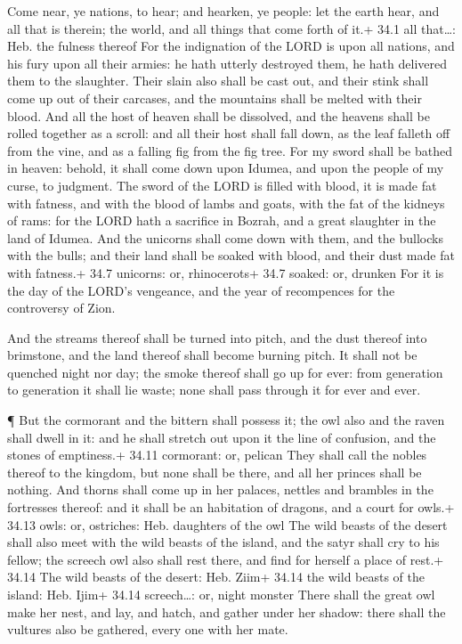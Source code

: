  Come near, ye nations, to hear; and hearken, ye people: let
the earth hear, and all that is therein; the world, and all things that
come forth of it.+ 34.1 all that\ldots: Heb. the fulness thereof
 For the indignation of the LORD is upon all nations, and
his fury upon all their armies: he hath utterly destroyed them, he hath
delivered them to the slaughter.  Their slain also shall be
cast out, and their stink shall come up out of their carcases, and the
mountains shall be melted with their blood.  And all the
host of heaven shall be dissolved, and the heavens shall be rolled
together as a scroll: and all their host shall fall down, as the leaf
falleth off from the vine, and as a falling fig from the fig tree.
 For my sword shall be bathed in heaven: behold, it shall
come down upon Idumea, and upon the people of my curse, to judgment.
 The sword of the LORD is filled with blood, it is made fat
with fatness, and with the blood of lambs and goats, with the fat of the
kidneys of rams: for the LORD hath a sacrifice in Bozrah, and a great
slaughter in the land of Idumea.  And the unicorns shall
come down with them, and the bullocks with the bulls; and their land
shall be soaked with blood, and their dust made fat with fatness.+ 34.7
unicorns: or, rhinocerots+ 34.7 soaked: or, drunken  For it
is the day of the LORD's vengeance, and the year of recompences for the
controversy of Zion.

 And the streams thereof shall be turned into pitch, and the
dust thereof into brimstone, and the land thereof shall become burning
pitch.  It shall not be quenched night nor day; the smoke
thereof shall go up for ever: from generation to generation it shall lie
waste; none shall pass through it for ever and ever.

 ¶ But the cormorant and the bittern shall possess it; the
owl also and the raven shall dwell in it: and he shall stretch out upon
it the line of confusion, and the stones of emptiness.+ 34.11 cormorant:
or, pelican  They shall call the nobles thereof to the
kingdom, but none shall be there, and all her princes shall be nothing.
 And thorns shall come up in her palaces, nettles and
brambles in the fortresses thereof: and it shall be an habitation of
dragons, and a court for owls.+ 34.13 owls: or, ostriches: Heb.
daughters of the owl  The wild beasts of the desert shall
also meet with the wild beasts of the island, and the satyr shall cry to
his fellow; the screech owl also shall rest there, and find for herself
a place of rest.+ 34.14 The wild beasts of the desert: Heb. Ziim+ 34.14
the wild beasts of the island: Heb. Ijim+ 34.14 screech\ldots: or, night
monster  There shall the great owl make her nest, and lay,
and hatch, and gather under her shadow: there shall the vultures also be
gathered, every one with her mate.


